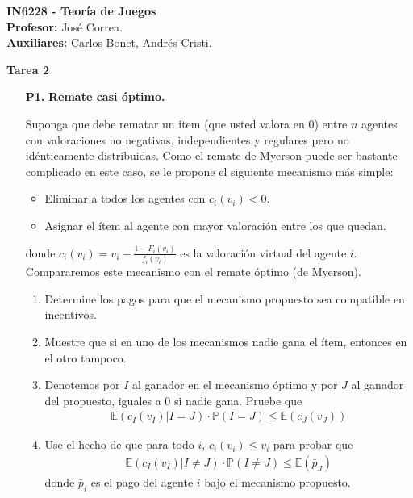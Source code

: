 \documentclass[11pt, spanish]{article}
\theoremstyle{plain}
\newcommand{\PP}{\mathbb{P}}
\newcommand{\E}{\mathbb{E}}
\begin{document}

\begin{flushleft}
  \textbf{IN6228 - Teor\'ia de Juegos}
  \\\textbf{Profesor:} Jos\'e Correa.
  \\\textbf{Auxiliares:} Carlos Bonet, Andr\'es Cristi.
\end{flushleft}


\begin{center}
  \Large{\textbf{Tarea 2}}
\end{center}




\begin{itemize}
  \item[\textbf{P1.}] \textbf{Remate casi óptimo.}

Suponga que debe rematar un ítem (que usted valora
en 0) entre $n$ agentes
con valoraciones no negativas, independientes y regulares pero no idénticamente
distribuidas. Como el remate
de Myerson puede ser bastante complicado en este caso, se le propone
el siguiente mecanismo más simple:
\begin{itemize}
    \item Eliminar a todos los agentes con $c_i(v_i)<0$.
    \item Asignar el ítem al agente con mayor valoración entre los que quedan.
\end{itemize}
donde $c_i(v_i)= v_i - \frac{1-F_i(v_i)}{f_i(v_i)}$ es la valoración virtual del agente $i$.
Compararemos este mecanismo con el remate óptimo (de Myerson).
\begin{enumerate}
    \item Determine los pagos para que el mecanismo propuesto sea compatible en incentivos.
    \item Muestre que si en uno de los mecanismos nadie gana el ítem, entonces en el otro tampoco.
    \item Denotemos por $I$ al ganador en el mecanismo
    óptimo y por $J$ al ganador del propuesto, iguales a $0$ si
    nadie gana.  Pruebe que
    \begin{align}
      \E(c_I(v_I) | I=J)\cdot \PP(I=J) \leq \E(c_J(v_J)) \label{eq1}
    \end{align}
    
    \item Use el hecho de que para todo $i$,
    $c_i(v_i) \leq v_i$ para probar que 
    \begin{align}
      \E( c_I(v_I) | I\neq J) \cdot \PP(I\neq J )\leq \E(\bar{p}_J ) \label{eq2}
    \end{align}
    donde $\bar{p}_i$ es el pago del agente $i$
    bajo el mecanismo propuesto.
    

\end{enumerate}
\end{itemize}
\end{document}
